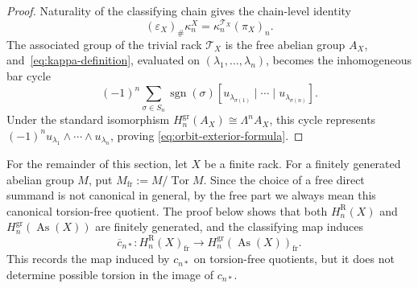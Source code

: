 \documentclass[10pt,a4paper]{amsart}
\DeclareMathOperator{\As}{As}
\DeclareMathOperator{\Tor}{Tor}
\DeclareMathOperator{\sgn}{sgn}
\newcommand{\gr}{\mathrm{gr}}
\newcommand{\R}{\mathrm R}
\begin{document}
\begin{proof}
Naturality of the classifying chain gives the chain-level identity
\[
 (\varepsilon_X)_\#\kappa_n^X
 =\kappa_n^{\mathcal T_X}(\pi_X)_n.
\]
The associated group of the trivial rack $\mathcal T_X$ is the free abelian
group $A_X$, and~\eqref{eq:kappa-definition}, evaluated on
$(\lambda_1,\ldots,\lambda_n)$, becomes the inhomogeneous bar cycle
\[
 (-1)^n\sum_{\sigma\in S_n}\sgn(\sigma)
 [u_{\lambda_{\sigma(1)}}\mid\cdots\mid u_{\lambda_{\sigma(n)}}].
\]
Under the standard isomorphism
$H_n^{\gr}(A_X)\cong\Lambda^nA_X$, this cycle represents
$(-1)^n u_{\lambda_1}\wedge\cdots\wedge u_{\lambda_n}$, proving
\eqref{eq:orbit-exterior-formula}.
\end{proof}

For the remainder of this section, let $X$ be a finite rack. For a finitely
generated abelian group $M$, put $M_{\mathrm{fr}}:=M/\Tor M$. Since the choice
of a free direct summand is not canonical in general, by the free part we
always mean this canonical torsion-free quotient. The proof below shows that
both $H_n^\R(X)$ and $H_n^{\gr}(\As(X))$ are finitely generated, and the
classifying map induces
\[
 \overline c_{n*}\colon H_n^\R(X)_{\mathrm{fr}}
 \longrightarrow H_n^{\gr}(\As(X))_{\mathrm{fr}}.
\]
This records the map induced by $c_{n*}$ on torsion-free quotients, but it
does not determine possible torsion in the image of $c_{n*}$.
\end{document}
